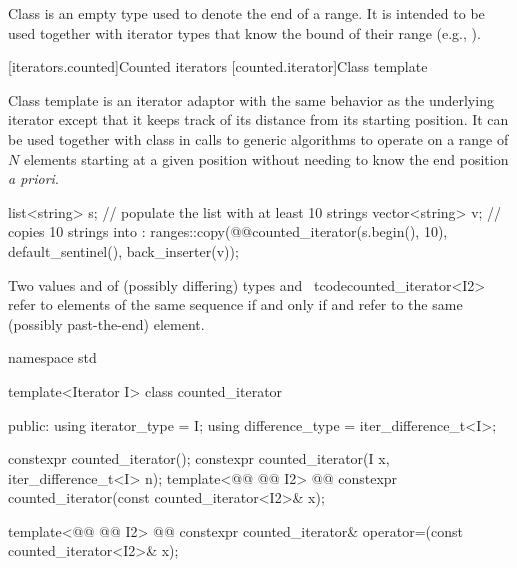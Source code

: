 \begin{addedblock}
\pnum
Class  is an empty type used to denote the end of a
range. It is intended to be used together with iterator types that know the bound
of their range (e.g., ).


[iterators.counted]{Counted iterators}
[counted.iterator]{Class template }

\pnum
Class template  is an iterator adaptor
with the same behavior as the underlying iterator except that it
keeps track of its distance from its starting position. It can be
used together with class  in calls to generic
algorithms to operate on a range of $N$ elements starting at a given
position without needing to know the end position \textit{a priori}.


\pnum
\begin{example}
\begin{codeblock}
list<string> s;
// populate the list  with at least 10 strings
vector<string> v;
// copies 10 strings into :
ranges::copy(@@counted_iterator(s.begin(), 10), default_sentinel(), back_inserter(v));
\end{codeblock}
\end{example}

\pnum
Two values  and  of (possibly differing) types
and \
tcode{counted_iterator<I2>}
refer to elements of the same sequence if and only if
and
refer to the same (possibly past-the-end) element.

%
\begin{codeblock}
namespace std {
  template<Iterator I>
  class counted_iterator {
  public:
    using iterator_type = I;
    using difference_type = iter_difference_t<I>;

    constexpr counted_iterator();
    constexpr counted_iterator(I x, iter_difference_t<I> n);
    template<@@ @@ I2>
      @@
        constexpr counted_iterator(const counted_iterator<I2>& x);

    template<@@ @@ I2>
      @@
        constexpr counted_iterator& operator=(const counted_iterator<I2>& x);

}}
\end{codeblock}
\end{addedblock}
